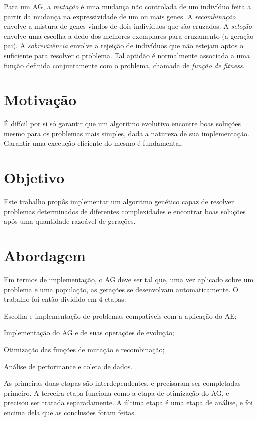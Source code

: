 Para um AG, a \emph{mutação} é uma mudança não controlada de um indivíduo feita a partir da mudança na expressividade de um ou mais genes. A \emph{recombinação} envolve a mistura de genes vindos de dois indivíduos que são cruzados. A \emph{seleção} envolve uma escolha a dedo dos melhores exemplares para cruzamento (a geração pai). A \emph{sobrevivência} envolve a rejeição de indivíduos que não estejam aptos o suficiente para resolver o problema. Tal aptidão é normalmente associada a uma função definida conjuntamente com o problema, chamada de \emph{função de fitness}.

\section{Motivação}

É difícil por si só garantir que um algoritmo evolutivo encontre boas soluções mesmo para os problemas mais simples, dada a natureza de sua implementação. Garantir uma execução eficiente do mesmo é fundamental.

\section{Objetivo}

Este trabalho propôs implementar um algoritmo genético capaz de resolver problemas determinados de diferentes complexidades e encontrar boas soluções após uma quantidade razoável de gerações.

\section{Abordagem}

Em termos de implementação, o AG deve ser tal que, uma vez aplicado sobre um problema e uma população, as gerações se desenvolvam automaticamente. O trabalho foi então dividido em 4 etapas:

\begin{enumerate}[label={[\arabic*]}]
	\item Escolha e implementação de problemas compatíveis com a aplicação do AE;
	\item Implementação do AG e de suas operações de evolução;
	\item Otimização das funções de mutação e recombinação;
	\item Análise de performance e coleta de dados.
\end{enumerate}

As primeiras duas etapas são interdependentes, e precisaram ser completadas primeiro. A terceira etapa funciona como a etapa de otimização do AG, e precisou ser tratada separadamente. A última etapa é uma etapa de análise, e foi encima dela que as conclusões foram feitas.

